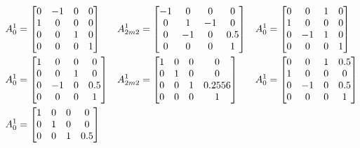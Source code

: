 \documentclass{UoNMCHA}
\numberwithin{equation}{section}
\begin{document}
\begin{align*}
	A_0^1 &= 
	\begin{bmatrix}
	0 & -1 & 0 & 0 \\
	1 & 0 & 0 & 0\\
	0 & 0 & 1 & 0\\
	0 & 0 & 0 & 1\\
	\end{bmatrix} & 		
	A_{2m2}^1 &= 
	\begin{bmatrix}
	-1 & 0 & 0 & 0 \\
	0 & 1 & -1 & 0\\
	0 & -1 & 0 & 0.5\\
	0 & 0 & 0 & 1\\
	\end{bmatrix} &	
		A_0^1 &= 
	\begin{bmatrix}
	0 & 0 & 1 & 0 \\
	1 & 0 & 0 & 0\\
	0 & -1 & 1 & 0\\
	0 & 0 & 0 & 1\\
	\end{bmatrix} \\ \vspace{5mm}
		A_0^1 &= 
	\begin{bmatrix}
	1 & 0 & 0 & 0 \\
	0 & 0 & 1 & 0\\
	0 & -1 & 0 & 0.5\\
	0 & 0 & 0 & 1\\
	\end{bmatrix} & 		
	A_{2m2}^1 &= 
	\begin{bmatrix}
	1 & 0 & 0 & 0 \\
	0 & 1 & 0 & 0\\
	0 & 0 & 1 & 0.2556\\
	0 & 0 & 0 & 1\\
	\end{bmatrix} &	
	A_0^1 &= 
	\begin{bmatrix}
	0 & 0 & 1 & 0.5 \\
	1 & 0 & 0 & 0\\
	0 & -1 & 0 & 0.5\\
	0 & 0 & 0 & 1\\
	\end{bmatrix} \\ \vspace{5mm}
			A_0^1 &= 
	\begin{bmatrix}
	1 & 0 & 0 & 0 \\
	0 & 1 & 0 & 0\\
	0 & 0 & 1 & 0.5\\

\end{bmatrix}
\end{align*}
\end{document}
